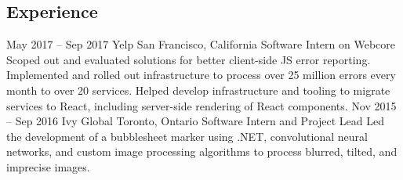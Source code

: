\documentclass{resume}
\begin{document}
  \begin{main}
    \vspace{0.2cm}%
    \section{Experience}
      \begin{entrylist}
        \rightentry%
          {May 2017 -- Sep 2017}%
          {Yelp}%
          {San Francisco, California}%
          {Software Intern on Webcore}%
          {%
          {%
            Scoped out and evaluated solutions for better client-side JS error reporting. %
          }%
          {%
            Implemented and rolled out infrastructure to process over 25 million errors every %
            month to over 20 services. %
          }%
          {%
            Helped develop infrastructure and tooling to migrate services to React, including %
            server-side rendering of React components. %
          }}
        \rightentry%
          {Nov 2015 -- Sep 2016}%
          {Ivy Global}%
          {Toronto, Ontario}%
          {Software Intern and Project Lead}%
          {%
          {%
            Led the development of a bubblesheet marker using .NET, convolutional neural %
            networks, and custom image processing algorithms to process blurred, tilted, and %
            imprecise images. %
          }}
      \end{entrylist}

\end{main}
\end{document}
